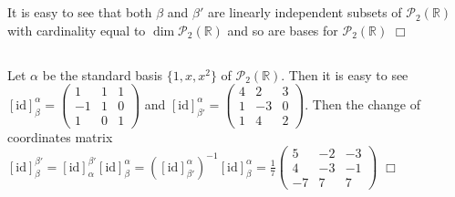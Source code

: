 \documentclass{article}
\begin{document}
\section{}
\subsection{}
It is easy to see that both $\beta$ and $\beta'$ are linearly independent subsets of $\mathcal{P}_2(\mathbb{R})$ with cardinality equal to $\dim \mathcal{P}_2(\mathbb{R})$ and so are bases for $\mathcal{P}_2(\mathbb{R})$ $\Box$
\subsection{}
Let $\alpha$ be the standard basis $\{1,x,x^2\}$ of $\mathcal{P}_2(\mathbb{R})$. Then it is easy to see $[\textrm{id}]_\beta^\alpha = \left(\begin{matrix}1&1&1\\-1&1&0\\1&0&1\end{matrix}\right)$ and $[\textrm{id}]_{\beta'}^\alpha = \left(\begin{matrix}4&2&3\\1&-3&0\\1&4&2\end{matrix}\right)$. Then the change of coordinates matrix $[\textrm{id}]_\beta^{\beta'} = [\textrm{id}]_\alpha^{\beta'} [\textrm{id}]_\beta^\alpha = \left([\textrm{id}]_{\beta'}^\alpha\right)^{-1}  [\textrm{id}]_\beta^\alpha = \frac{1}{7} \left(\begin{matrix}5&-2&-3\\4&-3&-1\\-7&7&7\end{matrix}\right)$ $\Box$
\end{document}
